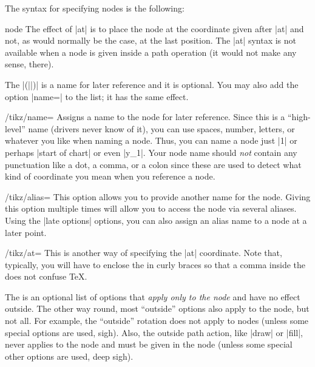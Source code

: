 The syntax for specifying nodes is the following:
\begin{pathoperation}{node}{%
    }
  The effect of |at| is to place the node at the coordinate given
  after |at| and not, as would normally be the case, at the last
  position. The |at| syntax is not available when a node is given
  inside a path operation (it would not make any sense, there).

  The |(||)| is a name for later reference and it is
  optional. You may also add the option |name=| to the
   list; it has the same effect.

  \begin{key}{/tikz/name=}
    Assigns a name to the node for later reference. Since this is a
    ``high-level'' name (drivers never know of it), you can use spaces,
    number, letters, or whatever you like when naming a node. Thus, you
    can name a node just |1| or perhaps |start of chart| or even
    |y_1|. Your node name should \emph{not} contain any punctuation like
    a dot, a comma, or a colon since these are used to detect what kind
    of coordinate you mean when you reference a node.
  \end{key}

  \begin{key}{/tikz/alias=}
    This option allows you to provide another name for the
    node. Giving this option multiple times will allow you to access
    the node via several aliases. Using the |late options| options,
    you can also assign an alias name to a node at a later point.
  \end{key}

  \begin{key}{/tikz/at=}
    This is another way of specifying the |at| coordinate. Note that,
    typically, you will have to enclose the  in curly
    braces so that a comma inside the  does not
    confuse \TeX.
  \end{key}

  The  is an optional list of options that \emph{apply
    only to the node} and have no effect outside. The other way round,
  most ``outside'' options also apply to the node, but not all. For
  example, the ``outside'' rotation does not apply to nodes (unless some
  special options are used, sigh). Also, the outside path action, like
  |draw| or |fill|, never applies to the node and must be given in the
  node (unless some special other options are used, deep sigh).


\end{pathoperation}

